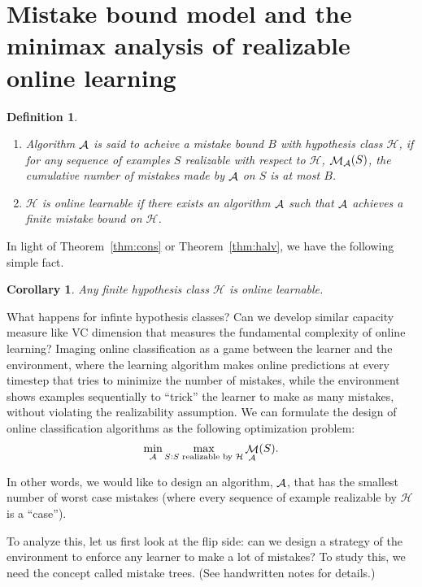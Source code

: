 \documentclass{article}
\newtheorem{corollary}{Corollary}
\newtheorem{definition}{Definition}
\DeclareMathOperator{\Acal}{{\cal A}}
\DeclareMathOperator{\Mcal}{{\cal M}}
\newcommand{\Hcal}{\mathcal{H}}
\begin{document}
\section{Mistake bound model and the minimax analysis of realizable online learning}

\begin{definition}
  \begin{enumerate}
  \item Algorithm $\Acal$ is said to acheive a mistake bound $B$ with hypothesis class $\Hcal$,
  if for any sequence of examples $S$ realizable with respect to $\Hcal$, $\Mcal_{\Acal}(S)$,
  the cumulative number of mistakes made by $\Acal$ on $S$ is at most $B$.
  \item $\Hcal$ is online learnable if there exists an algorithm $\Acal$ such that $\Acal$ achieves a finite mistake bound on $\Hcal$.
\end{enumerate}
\end{definition}

In light of Theorem~\ref{thm:cons} or Theorem~\ref{thm:halv}, we have the following simple fact.

\begin{corollary}
Any finite hypothesis class $\Hcal$ is online learnable.
\end{corollary}

What happens for infinte hypothesis classes? Can we develop similar capacity measure like VC dimension that measures the fundamental complexity of online learning? Imaging online classification as a game between the learner and the environment, where the learning algorithm makes online predictions at every timestep that tries to minimize the number of mistakes, while the environment shows examples sequentially to ``trick'' the learner to make as many mistakes, without violating the realizability assumption. We can formulate the design of online classification algorithms as the following optimization problem:
\[ \min_{\Acal} \max_{S: S \text{ realizable by } \Hcal} \Mcal_{\Acal}(S). \]

In other words, we would like to design an algorithm, $\Acal$, that has the smallest number of worst case mistakes (where every sequence of example realizable by $\Hcal$ is a ``case'').

To analyze this, let us first look at the flip side: can we design a strategy of the environment to enforce any learner to make a lot of mistakes? To study this, we need the concept called mistake trees. (See handwritten notes for details.)

\end{document}

